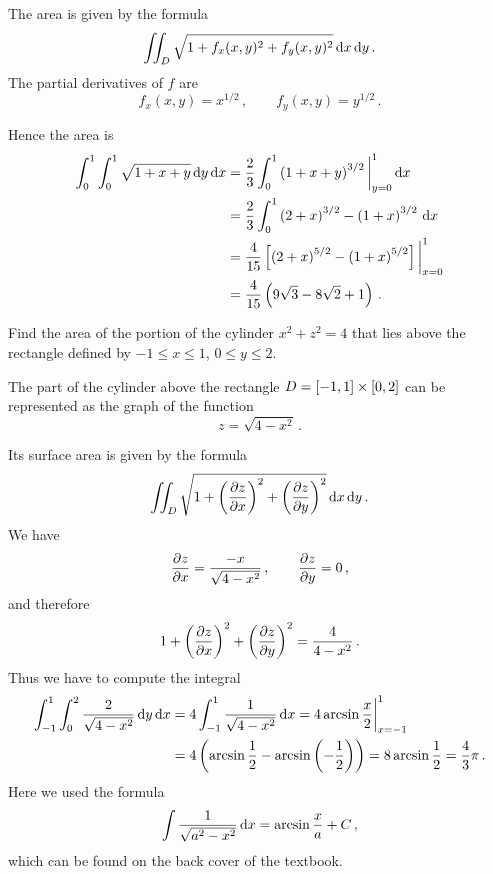 \begin{solution}
The area is given by the formula
\[
\iint_D \sqrt{1 + f_x(x,y)^2 + f_y(x,y)^2} \,\mathrm{d} x \,\mathrm{d} y\,.
\]
The partial derivatives of $f$ are
\[
f_x(x,y) = x^{1/2}\,,\qquad
f_y(x,y) = y^{1/2}\,.
\]
\begin{minipage}[c]{0.63\linewidth}
Hence the area is
\begin{align*}
\int_0^1 \int_0^1 \sqrt{1 + x + y} \,\mathrm{d} y \,\mathrm{d} x
&= \frac 23 \int_0^1 \left( 1+x+y\right)^{3/2} \bigg|_{y=0}^1 \,\mathrm{d} x \\
&= \frac 23 \int_0^1 \left(2 + x\right)^{3/2} - \left(1+x\right)^{3/2} \,\mathrm{d} x \\
&= \frac 4{15} \left[ \left(2 + x\right)^{5/2} - \left(1+x\right)^{5/2} \right] \bigg|_{x=0}^1 \\
&= \frac 4{15} \left( 9\sqrt{3} - 8 \sqrt{2} + 1\right)\,.
\end{align*}
\end{minipage}
\begin{minipage}[c]{0.35\textwidth}
\begin{center}
\end{center}
\end{minipage}
\end{solution}

\begin{question}
Find the area of the portion of the cylinder $x^2+z^2=4$ that lies above the rectangle defined by $-1 \leq x \leq 1$, $0\leq y \leq 2$.
\end{question}

\begin{solution}
The part of the cylinder above the rectangle $D = [-1,1]\times [0,2]$ can be represented as the graph of the function
\[
z = \sqrt{4-x^2}\,.
\]

\begin{wrapfigure}{r}{0.35\textwidth}
\begin{center}
\end{center}
\end{wrapfigure}

Its surface area is given by the formula
\[
\iint_D \sqrt{1 + \left(\frac{\partial z}{\partial x}\right)^2 + \left(\frac{\partial z}{\partial y}\right)^2} \,\mathrm{d} x \,\mathrm{d} y\,.
\]
We have
\[
\frac{\partial z}{\partial x} = \frac{-x}{\sqrt{4-x^2}}\,,\qquad
\frac{\partial z}{\partial y} = 0\,,
\]
and therefore
\[
1 + \left(\frac{\partial z}{\partial x}\right)^2 + \left(\frac{\partial z}{\partial y}\right)^2 = \frac{4}{4-x^2}\,.
\]
Thus we have to compute the integral
\begin{align*}
\int_{-1}^1 \int_0^2 \frac{2}{\sqrt{4-x^2}} \,\mathrm{d} y \,\mathrm{d} x
&= 4 \int_{-1}^1 \frac{1}{\sqrt{4-x^2}} \,\mathrm{d} x = 4 \arcsin \frac x2 \bigg|_{x=-1}^1 \\
&= 4 \left( \arcsin \frac 12 - \arcsin \left(-\frac 12\right)\right) = 8 \arcsin \frac 12  = \frac 43 \pi\,.
\end{align*}
Here we used the formula
\[
\int \frac{1}{\sqrt{a^2 - x^2}} \,\mathrm{d} x = \arcsin \frac xa + C\,,
\]
which can be found on the back cover of the textbook.
\end{solution}

